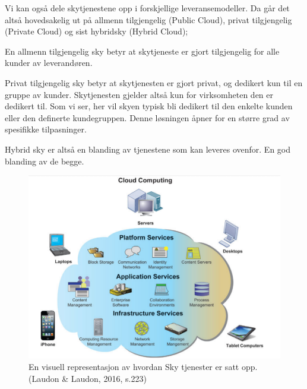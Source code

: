 Vi kan også dele skytjenestene opp i forskjellige leveransemodeller. Da går det altså hovedsakelig ut på allmenn tilgjengelig {\small (Public Cloud)}, privat tilgjengelig {\small (Private Cloud)} og sist hybridsky {\small (Hybrid Cloud)};\par
\begin{description}[noitemsep]
\item[Public Cloud] En allmenn tilgjengelig sky betyr at skytjeneste er gjort tilgjengelig for alle kunder av leverandøren.
\item[Private Cloud] Privat tilgjengelig sky betyr at skytjenesten er gjort privat, og dedikert kun til en gruppe av kunder. Skytjenesten gjelder altså kun for virksomheten den er dedikert til. Som vi ser, her vil skyen typisk bli dedikert til den enkelte kunden eller den definerte kundegruppen. Denne løsningen åpner for en større grad av spesifikke tilpasninger.
\item[Hybrid Cloud] Hybrid sky er altså en blanding av tjenestene som kan leveres ovenfor. En god blanding av de begge.
\end{description}
\begin{figure}[H]
\centering
\includegraphics[width=6.5in]{Bilder/cc.PNG}
\caption{En visuell representasjon av hvordan Sky tjenester er satt opp.(Laudon \& Laudon, 2016, s.223)}
\end{figure}

